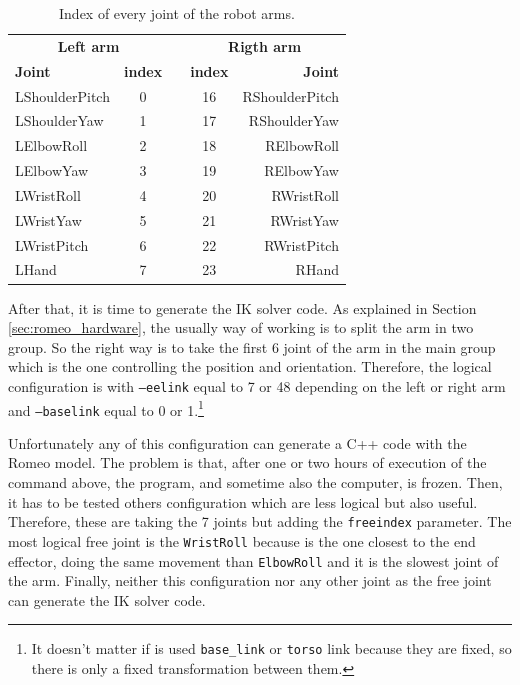 \documentclass[12pt,a4paper,final,twoside,openright]{report}
\begin{document}
\begin{table}[!h]
\begin{center}
\begin{tabular}{|l|c|c|c|r|}
\hline
\multicolumn{2}{|c|}{\textbf{Left arm}} & & \multicolumn{2}{|c|}{\textbf{Rigth arm}} \\ \cline{1-2}\cline{4-5}
\textbf{Joint} & \textbf{index} & & \textbf{index} & \textbf{Joint} \\ \cline{1-2}\cline{4-5}
LShoulderPitch & 0 & & 16 & RShoulderPitch \\
LShoulderYaw & 1 & & 17 & RShoulderYaw \\
LElbowRoll & 2 & & 18 & RElbowRoll \\
LElbowYaw & 3 & & 19 & RElbowYaw \\                            
LWristRoll & 4 & & 20 & RWristRoll \\                   
LWristYaw & 5 & & 21 & RWristYaw \\ \cline{1-2}\cline{4-5}
LWristPitch & 6 & & 22 & RWristPitch \\
LHand & 7 & & 23 & RHand \\ \hline
\end{tabular}
\caption{Index of every joint of the robot arms.\label{tab:joint_index_ikfast}}
\end{center}
\end{table}

After that, it is time to generate the IK solver code. As explained in Section \ref{sec:romeo_hardware}, the usually way of working is to split the arm in two group. So the right way is to take the first 6 joint of the arm in the main group which is the one controlling the position and orientation. Therefore, the logical configuration is with \texttt{--eelink} equal to 7 or 48 depending on the left or right arm and \texttt{--baselink} equal to 0 or 1.\footnote{It doesn't matter if is used \texttt{base\_link} or \texttt{torso} link because they are fixed, so there is only a fixed transformation between them.}

Unfortunately any of this configuration can generate a C++ code with the Romeo model. The problem is that, after one or two hours of execution of the command above, the program, and sometime also the computer, is frozen. Then, it has to be tested others configuration which are less logical but also useful. Therefore, these are taking the 7 joints but adding the \texttt{freeindex} parameter. The most logical free joint is the \texttt{WristRoll} because is the one closest to the end effector, doing the same movement than \texttt{ElbowRoll} and it is the slowest joint of the arm. Finally, neither this configuration nor any other joint as the free joint can generate the IK solver code.
\end{document}
